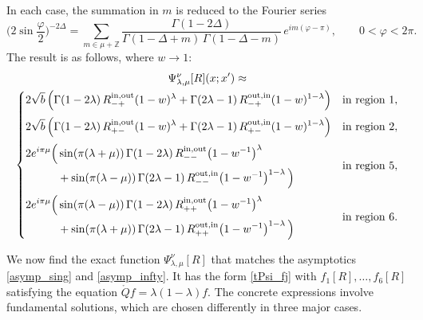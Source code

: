 \documentclass[11pt]{article}
\newcommand{\vp}{\varphi}
\newcommand{\ZZ}{\mathbb{Z}}
\newcommand{\IN}{\text{in}}
\newcommand{\OUT}{\text{out}}
\newcommand{\rQ}{\mathring{Q}}
\begin{document}
In each case, the summation in $m$ is reduced to the Fourier series
\begin{equation}
\biggl(2\sin\frac{\vp}{2}\biggr)^{-2\Delta} =\sum_{m\in\mu+\ZZ}
\frac{\Gamma(1-2\Delta)}{\Gamma(1-\Delta+m)\,\Gamma(1-\Delta-m)}\,
e^{im(\vp-\pi)},\qquad 0<\vp<2\pi.
\end{equation}
The result is as follows, where $w\to 1$:
\begin{multline}\label{asymp_infty}
\Psi^{\nu}_{\lambda,\mu}[R](x;x')\approx\\
\begin{dcases}
2\sqrt{b}\,\Bigl(\Gamma(1-2\lambda)\,R^{\IN,\OUT}_{-+}(1-w)^{\lambda}
+\Gamma(2\lambda-1)\,R^{\OUT,\IN}_{-+}(1-w)^{1-\lambda}\Bigr)
& \text{in region }1,
\\[2pt]
2\sqrt{b}\,\Bigl(\Gamma(1-2\lambda)\,R^{\IN,\OUT}_{+-}(1-w)^{\lambda}
+\Gamma(2\lambda-1)\,R^{\OUT,\IN}_{+-}(1-w)^{1-\lambda}\Bigr)
& \text{in region }2,
\\[2pt]
\begin{aligned}
2e^{i\pi\mu}\Bigl(
&\sin(\pi(\lambda+\mu))\,\Gamma(1-2\lambda)\,
R^{\IN,\OUT}_{--}\bigl(1-w^{-1}\bigr)^{\lambda}\\
&+\sin(\pi(\lambda-\mu))\,\Gamma(2\lambda-1)\,
R^{\OUT,\IN}_{--}\bigl(1-w^{-1}\bigr)^{1-\lambda}\,\Bigr)
\end{aligned}
& \text{in region }5,
\\[2pt]
\begin{aligned}
2e^{i\pi\mu}\Bigl(&\sin(\pi(\lambda-\mu))\,\Gamma(1-2\lambda)\,
R^{\IN,\OUT}_{++}\bigl(1-w^{-1}\bigr)^{\lambda}\\
&+\sin(\pi(\lambda+\mu))\,\Gamma(2\lambda-1)\,
R^{\OUT,\IN}_{++}\bigl(1-w^{-1}\bigr)^{1-\lambda}\,\Bigr)
\end{aligned}
& \text{in region }6.
\end{dcases}
\end{multline}

We now find the exact function $\Psi^{\nu}_{\lambda,\mu}[R]$ that matches the asymptotics \eqref{asymp_sing} and \eqref{asymp_infty}. It has the form \eqref{tPsi_fj} with $f_{1}[R],\ldots,f_{6}[R]$ satisfying the equation $\rQ f=\lambda(1-\lambda)f$. The concrete expressions involve fundamental solutions, which are chosen differently in three major cases.
\end{document}

